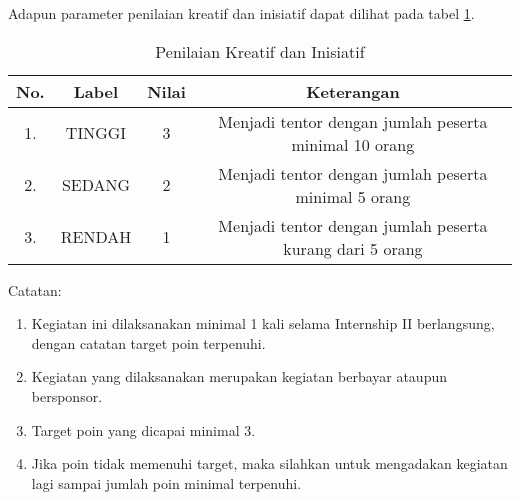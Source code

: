 Adapun parameter penilaian kreatif dan inisiatif dapat dilihat pada tabel \ref{tab:nilaikreatifinisiatif}.

\begin{table}[H]
\caption{Penilaian Kreatif dan Inisiatif}
\centering
\begin{tabular}{|c|c|c|c|}
\hline
\textbf{No.}&\textbf{Label}&\textbf{Nilai}&\textbf{Keterangan}\\
\hline
1.&TINGGI&3&Menjadi tentor dengan jumlah peserta minimal 10 orang\\
\hline
2.&SEDANG&2&Menjadi tentor dengan jumlah peserta minimal 5 orang\\
\hline
3.&RENDAH&1&Menjadi tentor dengan jumlah peserta kurang dari 5 orang\\
\hline
\end{tabular}
\label{tab:nilaikreatifinisiatif}
\end{table}

Catatan:
\begin{enumerate}
\item Kegiatan ini dilaksanakan minimal 1 kali selama Internship II berlangsung, dengan catatan target poin terpenuhi.
\item Kegiatan yang dilaksanakan merupakan kegiatan berbayar ataupun bersponsor.
\item Target poin yang dicapai minimal 3.
\item Jika poin tidak memenuhi target, maka silahkan untuk mengadakan kegiatan lagi sampai jumlah poin minimal terpenuhi.
\end{enumerate} 